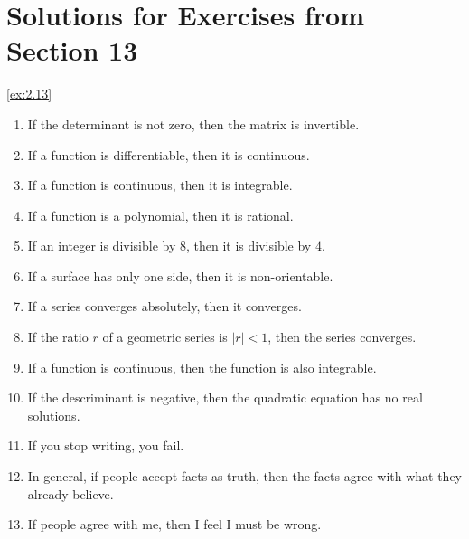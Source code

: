 \section*{Solutions for Exercises from Section 13}
\begin{solution}\label{sol:2.13}\ref{ex:2.13}
    \begin{enumerate}
        \item If the determinant is not zero, then the matrix is invertible. 
        \item If a function is differentiable, then it is continuous. 
        \item If a function is continuous, then it is integrable. 
        \item If a function is a polynomial, then it is rational. 
        \item If an integer is divisible by $8$, then it is divisible by $4$. 
        \item If a surface has only one side, then it is non-orientable. 
        \item If a series converges absolutely, then it converges. 
        \item If the ratio $r$ of a geometric series is $\lvert r \rvert<1$, then the series converges. 
        \item If a function is continuous, then the function is also integrable. 
        \item If the descriminant is negative, then the quadratic equation has no real solutions. 
        \item If you stop writing, you fail. 
        \item In general, if people accept facts as truth, then the facts agree with what they already believe. 
        \item If people agree with me, then I feel I must be wrong. 
    \end{enumerate}
\end{solution}